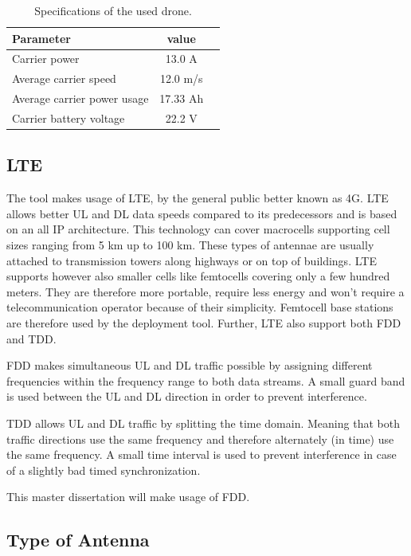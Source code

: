 \begin{table}[h!]
\centering
\begin{tabular}{|l|c|l|}
\hline
 Parameter          & value         \\    \hline
 Carrier power      & 13.0 A \\
 Average carrier speed           & 12.0 m/s       \\ 
 Average carrier power usage    & 17.33 Ah      \\ 
 Carrier battery voltage        & 22.2 V \\ \hline
\end{tabular}
\caption{Specifications of the used drone.}
\label{table:dronespecs}
\end{table}

\subsection{LTE}
The tool makes usage of \gls{LTE}, by the general public better known as 4G.  \gls{LTE} allows better \gls{UL} and \gls{DL} data speeds 
compared to its predecessors and is based on an all IP architecture. This technology can cover macrocells supporting cell sizes ranging from 5 km up to 100 km. 
These types of antennae are usually attached to transmission towers along highways or on top of buildings. LTE supports however also smaller cells like
femtocells covering only a few hundred meters. They are therefore more portable, require less energy and won't require a telecommunication operator because
of their simplicity. Femtocell base stations are therefore used by the deployment tool.
Further, \gls{LTE} also support both \gls{FDD} and \gls{TDD}.

\gls{FDD} makes simultaneous \gls{UL} and \gls{DL} traffic possible by assigning different frequencies within the frequency range 
to both data streams. A small guard band is used between the \gls{UL} and \gls{DL} direction in order to prevent interference.

\gls{TDD} allows  \gls{UL} and \gls{DL} traffic by splitting the time domain. Meaning that both traffic directions use the same frequency and therefore
alternately (in time) use the same frequency. A small time interval is used to prevent interference in case of a slightly bad timed synchronization.

This master dissertation will make usage of \gls{FDD}.

\subsection{Type of Antenna} %

